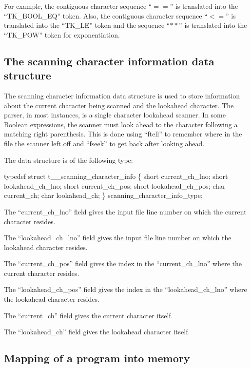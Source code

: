 For example, the contiguous character sequence ``$==$'' is translated
into the ``TK\_BOOL\_EQ'' token.   Also, the contiguous character
sequence ``$<=$'' is translated into the ``TK\_LE'' token and the sequence
``$**$'' is translated into the ``TK\_POW'' token for exponentiation.

\subsection{The scanning character information data structure}
\label{sec:scanning}

The scanning character information data structure is used to store
information about the current character being scanned and the lookahead
character.   The  parser, in most instances, is a single
character lookahead scanner.    In some Boolean expressions, the scanner
must look ahead to the character following a matching right parenthesis.
This is done using ``ftell'' to remember where in the file the scanner
left off and ``fseek'' to get back after looking ahead.

The data structure is of the following type:
\begin{codeexample}
typedef struct t__scanning_character_info
   \{
        short current_ch_lno;
        short lookahead_ch_lno;
        short current_ch_pos;
        short lookahead_ch_pos;
        char current_ch;
        char lookahead_ch;
   \} scanning_character_info_type;
\end{codeexample}


The ``current\_ch\_lno'' field gives the input file line number on which
the current character resides.

The ``lookahead\_ch\_lno'' field gives the input file line number on which
the lookahead character resides.

The ``current\_ch\_pos'' field gives the index in the ``current\_ch\_lno''
where the current character resides.

The ``lookahead\_ch\_pos'' field gives the index in the ``lookahead\_ch\_lno''
where the lookahead character resides.

The ``current\_ch'' field gives the current character itself.

The ``lookahead\_ch'' field gives the lookahead character itself.

\subsection{Mapping of a program into memory}
\label{sec:codeexample}

